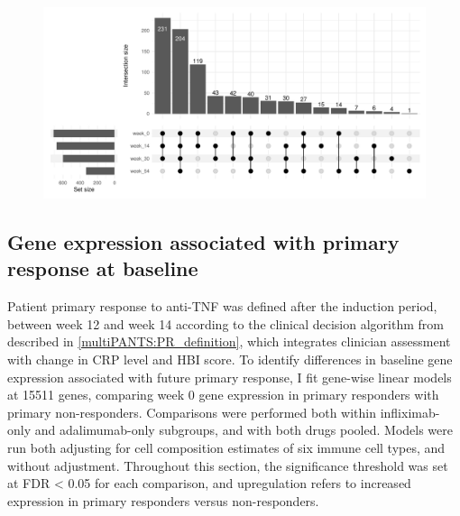 \begin{outline}
\begin{figure}
    \centering
    \includegraphics[width=1.0\textwidth,page=1]{mainmatter/figures/chapter_04/process_pheno.pheno_filtered_dge.Visit_Label_upset.pdf}
    \caption{}
    \label{fig:multipants_visits_upset}
\end{figure}



\subsection{Gene expression associated with primary response at baseline}

Patient primary response to anti-\gls{TNF} was defined after the induction period, between week 12 and week 14 according to the clinical decision algorithm from \autocite{kennedy2019PredictorsAntiTNFTreatment} described in \autoref{multiPANTS:PR_definition}, 
which integrates clinician assessment with change in \gls{CRP} level and \gls{HBI} score.
To identify differences in baseline gene expression associated with future primary response, 
I fit gene-wise linear models at 15511 genes, comparing week 0 gene expression in primary responders with primary non-responders.
Comparisons were performed both within infliximab-only and adalimumab-only subgroups, and with both drugs pooled.
Models were run both adjusting for cell composition estimates of six immune cell types, and without adjustment.
Throughout this section, the significance threshold was set at FDR < 0.05 for each comparison, and upregulation refers to increased expression in primary responders versus non-responders.


\end{outline}
